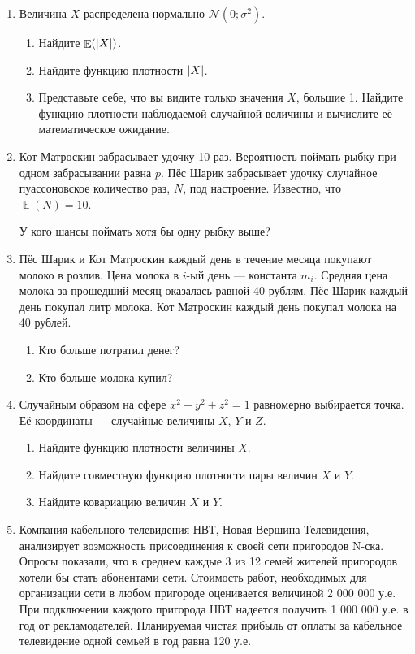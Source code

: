 \documentclass[12pt]{article} %
\DeclareMathOperator{\E}{\mathbb{E}}
\newcommand \cN{\mathcal{N}}
\begin{document}
\begin{enumerate}
    \item Величина $X$ распределена нормально $\cN(0;\sigma^2)$.
    \begin{enumerate}
        \item Найдите $\E(\abs{X})$.
        \item Найдите функцию плотности $\abs{X}$.
        \item Представьте себе, что вы видите только значения $X$, большие 1. 
        Найдите функцию плотности наблюдаемой случайной величины и вычислите её математическое ожидание. 
    \end{enumerate}

    \item Кот Матроскин забрасывает удочку 10 раз.
  Вероятность поймать рыбку при одном забрасывании равна $p$.
  Пёс Шарик забрасывает удочку случайное пуассоновское количество раз,
  $N$, под настроение. Известно, что $\E(N) = 10$.
  
  У кого шансы поймать хотя бы одну рыбку выше?

    \item Пёс Шарик и Кот Матроскин каждый день в течение месяца покупают молоко в розлив. 
    Цена молока в $i$-ый день — константа $m_i$. 
    Средняя цена молока за прошедший месяц оказалась равной 40 рублям. 
    Пёс Шарик каждый день покупал литр молока. Кот Матроскин каждый день покупал молока на 40 рублей. 
    
    \begin{enumerate}
        \item Кто больше потратил денег? 
        \item Кто больше молока купил?
    \end{enumerate}
    
  
  \item Случайным образом на сфере $x^2+y^2+z^2=1$ равномерно выбирается точка. 
  Её координаты — случайные величины $X$, $Y$ и $Z$.
  
  \begin{enumerate}
      \item Найдите функцию плотности величины $X$.
      \item Найдите совместную функцию плотности пары величин $X$ и $Y$.
      \item Найдите ковариацию величин $X$ и $Y$.
  \end{enumerate}

  \item Компания кабельного телевидения НВТ, Новая Вершина Телевидения, анализирует возможность
  присоединения к своей сети пригородов N-ска. Опросы показали, что в среднем каждые 3 из 12
  семей жителей пригородов хотели бы стать абонентами сети. Стоимость работ, необходимых для
  организации сети в любом пригороде оценивается величиной 2 000 000 у.е. При подключении каждого
  пригорода НВТ надеется получить 1 000 000 у.е. в год от рекламодателей. Планируемая чистая прибыль
  от оплаты за кабельное телевидение одной семьей в год равна 120 у.е.
  

\end{enumerate}
\end{document}
